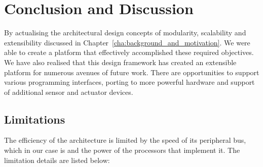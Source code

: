 \chapter{Conclusion and Discussion} 
By actualising the architectural design concepts of modularity, scalability and extensibility discussed in Chapter~\ref{cha:background_and_motivation}. We were able to create a platform that effectively accomplished these required objectives. We have also realised that this design framework has created an extensible platform for numerous avenues of future work. There are opportunities to support various programming interfaces, porting \xten to more powerful hardware and support of additional sensor and actuator devices.

\section{Limitations}
The efficiency of the \xten architecture is limited by the speed of its peripheral bus, which in our case is \iic and the power of the processors that implement it.
The limitation details are listed below:
